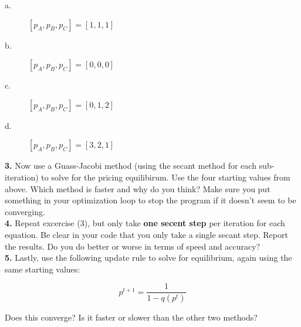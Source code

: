 \documentclass[10pt]{article}
\begin{document}
\begin{description}
	\item[a.] $[p_A,p_B,p_C] = [1,1,1]$
	\item[b.] $[p_A,p_B,p_C] =[0,0,0]$
	\item[c.] $[p_A,p_B,p_C] =[0,1,2]$
	\item[d.] $[p_A,p_B,p_C] =[3,2,1]$\\[2em]
\end{description}

\noindent
\textbf{3.}
Now use a Guass-Jacobi method (using the secant method for each sub-iteration) to solve for the pricing equilibirum. Use the four starting values from above. Which method is faster and why do you think? Make sure you put something in your optimization loop to stop the program if it doesn't seem to be converging.\\[2em]

\noindent
\textbf{4.}
Repeat excercise (3), but only take \textbf{one secent step} per iteration for each equation. Be clear in your code that you only take a single secant step. Report the results. Do you do better or worse in terms of speed and accuracy?\\[2em]


\noindent
\textbf{5.}
Lastly, use the following update rule to solve for equilibrium, again using the same starting values:

\begin{equation*}
	p^{t+1} = \frac{1}{1-q(p^t)}
\end{equation*}

Does this converge? Is it faster or slower than the other two methods?\\[2em]




\end{document}
